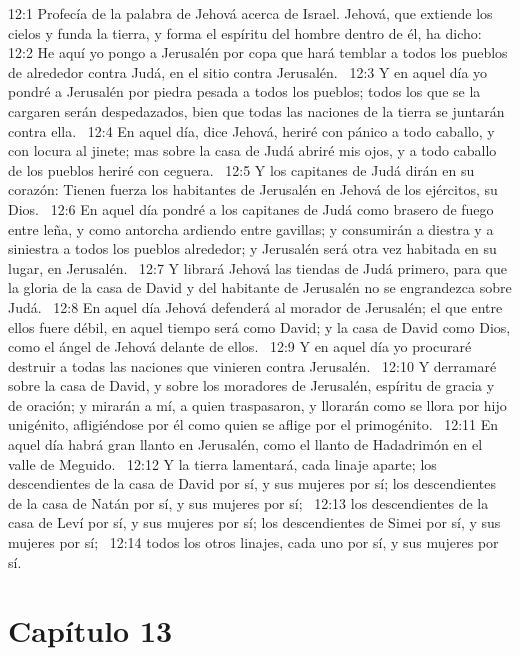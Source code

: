 12:1 Profecía de la palabra de Jehová acerca de Israel. Jehová, que extiende los cielos y funda la tierra, y forma el espíritu del hombre dentro de él, ha dicho:  
12:2 He aquí yo pongo a Jerusalén por copa que hará temblar a todos los pueblos de alrededor contra Judá, en el sitio contra Jerusalén.  
12:3 Y en aquel día yo pondré a Jerusalén por piedra pesada a todos los pueblos; todos los que se la cargaren serán despedazados, bien que todas las naciones de la tierra se juntarán contra ella.  
12:4 En aquel día, dice Jehová, heriré con pánico a todo caballo, y con locura al jinete; mas sobre la casa de Judá abriré mis ojos, y a todo caballo de los pueblos heriré con ceguera.  
12:5 Y los capitanes de Judá dirán en su corazón: Tienen fuerza los habitantes de Jerusalén en Jehová de los ejércitos, su Dios.  
12:6 En aquel día pondré a los capitanes de Judá como brasero de fuego entre leña, y como antorcha ardiendo entre gavillas; y consumirán a diestra y a siniestra a todos los pueblos alrededor; y Jerusalén será otra vez habitada en su lugar, en Jerusalén.  
12:7 Y librará Jehová las tiendas de Judá primero, para que la gloria de la casa de David y del habitante de Jerusalén no se engrandezca sobre Judá.  
12:8 En aquel día Jehová defenderá al morador de Jerusalén; el que entre ellos fuere débil, en aquel tiempo será como David; y la casa de David como Dios, como el ángel de Jehová delante de ellos.  
12:9 Y en aquel día yo procuraré destruir a todas las naciones que vinieren contra Jerusalén.  
12:10 Y derramaré sobre la casa de David, y sobre los moradores de Jerusalén, espíritu de gracia y de oración; y mirarán a mí, a quien traspasaron, y llorarán como se llora por hijo unigénito, afligiéndose por él como quien se aflige por el primogénito.  
12:11 En aquel día habrá gran llanto en Jerusalén, como el llanto de Hadadrimón en el valle de Meguido.  
12:12 Y la tierra lamentará, cada linaje aparte; los descendientes de la casa de David por sí, y sus mujeres por sí; los descendientes de la casa de Natán por sí, y sus mujeres por sí;  
12:13 los descendientes de la casa de Leví por sí, y sus mujeres por sí; los descendientes de Simei por sí, y sus mujeres por sí;  
12:14 todos los otros linajes, cada uno por sí, y sus mujeres por sí.  
\section*{Capítulo 13 }

